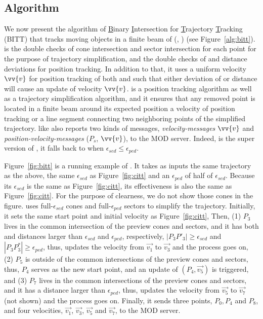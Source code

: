 \subsection{Algorithm}
We now present the algorithm of \underline{B}inary \underline{I}ntersection for \underline{T}rajectory \underline{T}racking (BITT) that tracks moving objects in a finite beam of \bed (\sed, \ped) (see Figure~\ref{alg:bitt}). 
%
\bitt is the double checks of cone intersection and sector intersection for each point for the purpose of trajectory simplification, and the double checks of \sed and \ped distance deviations for position tracking. In addition to that, it uses a uniform velocity $\vv{v}$ for position tracking of both \sed and \ped such that either deviation of \ped or \sed distance will cause an update of velocity $\vv{v}$. 
%
\bitt is a position tracking algorithm as well as a trajectory simplification algorithm, and it ensures that any removed point is located in a finite beam around its expected position \wrt a velocity of position tracking or a line segment connecting two neighboring points of the simplified trajectory. 
%
\bitt like \citt also reports two kinds of messages, \ie \emph{velocity-messages} $\vv{v}$ and \emph{position-velocity-messages} ($P_s$, $\vv{v}$), to the MOD server. 
Indeed, \bitt is the super version of \citt, \ie it falls back to \citt when $\epsilon_{sed} \le \epsilon_{ped}$.

\begin{example}
	Figure~\ref{fig:bitt} is a running example of \bitt. It takes as inputs the same trajectory as the above, the same $\epsilon_{sed}$ as Figure~\ref{fig:citt} and an $\epsilon_{ped}$ of half of $\epsilon_{sed}$. Because its $\epsilon_{sed}$ is the same as Figure~\ref{fig:citt}, its effectiveness is also the same as Figure~\ref{fig:citt}. For the purpose of clearness, we do not show those cones in the figure.
	\bitt uses full-$\epsilon_{sed}$ cones and full-$\epsilon_{ped}$ sectors to simplify the trajectory. Initially, it sets the same start point and initial velocity as Figure~\ref{fig:citt}, 
	Then, (1) $P_3$ lives in the common intersection of the preview cones and sectors, and it has both \sed and \ped distances larger than $\epsilon_{sed}$ and $\epsilon_{ped}$, respectively, \ie $|P_3P'_3| \ge \epsilon_{sed}$ and $|P_3P^*_3| \ge \epsilon_{ped}$, thus, \bitt updates the velocity from $\vec{v_1}$ to $\vec{v_3}$ and the process goes on, (2) $P_5$ is outside of the common intersections of the preview cones and sectors, thus, $P_4$ serves as the new start point, and an update of $(P_4, \vec{v_5})$ is triggered, and (3) $P_7$ lives in the common intersections of the preview cones and sectors, and it has a \ped distance larger than $\epsilon_{ped}$, thus, \bitt updates the velocity from $\vec{v_5}$ to $\vec{v_7}$ (not shown) and the process goes on. Finally, it sends three points, $P_0, P_4$ and $P_8$, and four velocities, $\vec{v_1}$, $\vec{v_3}$, $\vec{v_5}$ and $\vec{v_7}$, to the MOD server. 
\end{example}


